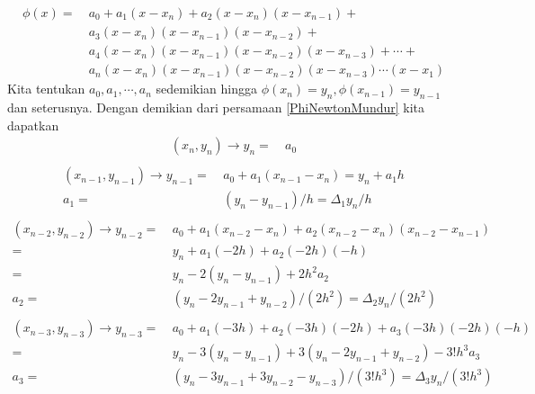 \begin{equation}\label{PhiNewtonMundur}
\begin{split}
\phi(x) =~& a_0 + a_1(x-x_n) + a_2(x-x_n)(x-x_{n-1})+\\
&a_3(x-x_n)(x-x_{n-1})(x-x_{n-2})+\\
&a_4(x-x_n)(x-x_{n-1})(x-x_{n-2})(x-x_{n-3})+\cdots+\\
&a_n(x-x_n)(x-x_{n-1})(x-x_{n-2})(x-x_{n-3})\cdots(x-x_1)
\end{split}
\end{equation}
Kita tentukan $a_0, a_1, \cdots, a_n$ sedemikian hingga $\phi(x_n) = y_n, \phi(x_{n-1}) = y_{n-1}$ dan seterusnya. Dengan demikian dari persamaan \ref{PhiNewtonMundur} kita dapatkan
\begin{equation*}
\begin{split}
(x_n, y_n) \rightarrow y_n =~& a_0\\
\end{split}
\end{equation*}
\begin{equation*}
\begin{split}
(x_{n-1}, y_{n-1}) \rightarrow y_{n-1} =~& a_0 + a_1(x_{n-1} - x_n) = y_n + a_1h\\
a_1 =~& (y_n - y_{n-1})/h = \Delta_1 y_n / h\\
\end{split}
\end{equation*}
\begin{equation*}
\begin{split}
(x_{n-2}, y_{n-2}) \rightarrow y_{n-2} =~& a_0 + a_1(x_{n-2} - x_n) + a_2(x_{n-2}-x_n)(x_{n-2}-x_{n-1})\\
=~& y_n + a_1(-2h) + a_2(-2h)(-h)\\
=~& y_n - 2(y_n - y_{n-1}) + 2h^2a_2\\
a_2 =~& (y_n-2y_{n-1}+y_{n-2})/(2h^2) = \Delta_2y_n/(2h^2)\\
\end{split}
\end{equation*}
\begin{equation*}
\begin{split}
(x_{n-3}, y_{n-3}) \rightarrow y_{n-3} =~& a_0 + a_1(-3h) + a_2(-3h)(-2h) + a_3(-3h)(-2h)(-h)\\
=~& y_n - 3(y_n-y_{n-1}) + 3(y_n-2y_{n-1}+y_{n-2}) - 3!h^3a_3\\
a_3 =~& (y_n - 3y_{n-1} + 3y_{n-2} - y_{n-3})/(3!h^3) = \Delta_3y_n/(3!h^3)\\
\end{split}
\end{equation*}

